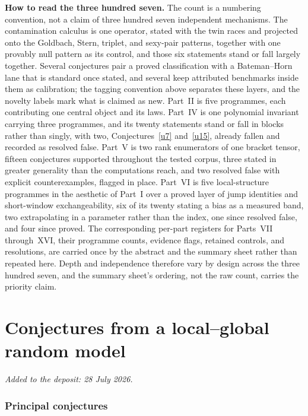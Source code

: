 \documentclass[11pt]{article}
\theoremstyle{definition}
\begin{document}
\medskip
\noindent\textbf{How to read the three hundred seven.}  The count is a numbering convention, not a claim of three hundred seven independent mechanisms.  The contamination calculus is one operator, stated with the twin races and projected onto the Goldbach, Stern, triplet, and sexy-pair patterns, together with one provably null pattern as its control, and those six statements stand or fall largely together.  Several conjectures pair a proved classification with a Bateman--Horn lane that is standard once stated, and several keep attributed benchmarks inside them as calibration; the tagging convention above separates these layers, and the novelty labels mark what is claimed as new.  Part~II is five programmes, each contributing one central object and its laws.  Part~IV is one polynomial invariant carrying three programmes, and its twenty statements stand or fall in blocks rather than singly, with two, Conjectures~\ref{u7} and~\ref{u15}, already fallen and recorded as resolved false.  Part~V is two rank enumerators of one bracket tensor, fifteen conjectures supported throughout the tested corpus, three stated in greater generality than the computations reach, and two resolved false with explicit counterexamples, flagged in place.  Part~VI is five local-structure programmes in the aesthetic of Part~I over a proved layer of jump identities and short-window exchangeability, six of its twenty stating a bias as a measured band, two extrapolating in a parameter rather than the index, one since resolved false, and four since proved.  The corresponding per-part registers for Parts~VII through~XVI, their programme counts, evidence flags, retained controls, and resolutions, are carried once by the abstract and the summary sheet rather than repeated here.  Depth and independence therefore vary by design across the three hundred seven, and the summary sheet's ordering, not the raw count, carries the priority claim.

\part{Conjectures from a local--global random model}

\medskip\noindent\emph{Added to the deposit: 28 July 2026.}\par\medskip

\section{Principal conjectures}
\end{document}
